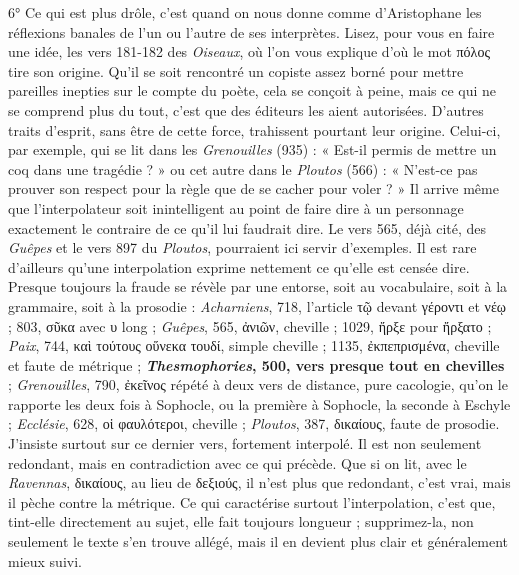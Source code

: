 \documentclass{book}%
\newcommand{\italique}[1]{\textit{#1}}%
\begin{document}
6° 	Ce qui est plus drôle, c'est quand on nous donne comme d'Aristophane les réflexions banales de l'un ou l'autre de ses interprètes. 
Lisez, pour vous en faire une idée, les vers 181-182 des \italique{Oiseaux}, où l'on vous explique d'où le mot πόλος tire son origine. 
Qu'il se soit rencontré un copiste assez borné pour mettre pareilles inepties sur le compte du poète, cela se conçoit à peine, mais ce qui ne se comprend plus du tout, c'est que des éditeurs les aient autorisées. D'autres traits d'esprit, sans être de cette force, trahissent pourtant leur origine. Celui-ci, par exemple, qui se lit dans les \italique{Grenouilles} (935) : « Est-il permis de mettre un coq dans une tragédie ? » ou cet autre dans le \italique{Ploutos} (566) : « N'est-ce pas prouver son respect pour la règle que de se cacher pour voler ? » 
Il arrive même que l'interpolateur soit inintelligent au point de faire dire à un personnage exactement le contraire de ce qu'il lui faudrait dire. Le vers 565, déjà cité, des \italique{Guêpes} et le vers 897 du \italique{Ploutos}, pourraient ici servir d'exemples. Il est rare d'ailleurs qu'une interpolation exprime nettement ce qu'elle est censée dire. 
Presque toujours la fraude se révèle par une entorse, soit au vocabulaire, soit à la grammaire, soit à la prosodie : \italique{Acharniens}, 718, l'article τῷ devant γέροντι et νέῳ ; 803,  σῦκα avec υ long ; \italique{Guêpes}, 565, ἀνιῶν, cheville ; 1029, ἤρξε pour ἤρξατο ; \italique{Paix}, 744, καὶ τούτους οὕνεκα τουδί, simple cheville ; 1135, ἐκπεπρισμένα, cheville et faute de métrique ; \textbf{\italique{Thesmophories}, 500, vers presque tout en chevilles} ; \italique{Grenouilles}, 790, ἐκεῖνος répété à deux vers de distance, pure cacologie, qu'on le rapporte les deux fois à Sophocle, ou la première à Sophocle, la seconde à Eschyle ; \italique{Ecclésie}, 628, οἱ φαυλότεροι, cheville ; \italique{Ploutos}, 387, δικαίους, faute de prosodie. 
J'insiste surtout sur ce dernier vers, fortement interpolé. Il est non seulement redondant, mais en contradiction avec ce qui précède. 
Que si on lit, avec le \italique{Ravennas}, δικαίους, au lieu de δεξιούς, il n'est plus que redondant, c'est vrai, mais il pèche contre la métrique. 
Ce qui caractérise surtout l'interpolation, c'est que, tint-elle directement au sujet, elle fait toujours longueur ; supprimez-la, non seulement le texte s'en trouve allégé, mais il en devient plus clair et généralement mieux suivi. 
\end{document}
